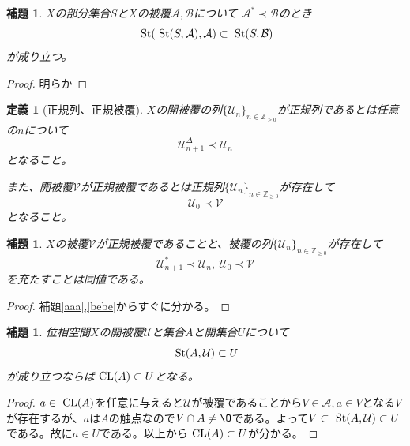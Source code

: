 \documentclass[leqno]{jsarticle}
\newtheorem{lem}[thm]{補題}
\newtheorem{df}[thm]{定義}
\newcommand{\zz}{\mathbb{Z}}
\newcommand{\cl}{\text{  {\rm CL}} }
\newcommand{\uu}{\mathcal{U}}
\newcommand{\A}{\mathcal{A}}
\newcommand{\B}{\mathcal{B}}
\newcommand{\s}{\text{  {\rm St}} }
\newcommand{\dd}{\Delta}
\newcommand{\pr}{\prec}
\newcommand{\zr}{\zz_{\ge0}}
\begin{document}
\begin{lem}
$X$の部分集合$S$と$X$の被覆$\A,\B$について
$\A^{*}\pr \B$のとき
\[
\s(\s(S,\A),\A)\subset  \s(S,\B)
\]
が成り立つ。
\end{lem}
\begin{proof}
明らか
\end{proof}


\begin{df}[正規列、正規被覆]
$X$の開被覆の列$\{\uu_n\}_{n\in \zr}$が正規列であるとは任意の$n$について
\[
\uu_{n+1}^{\dd}\pr \uu_n
\]
となること。\par
また、開被覆$\mathcal{V}$が正規被覆であるとは正規列$\{\uu_n\}_{n\in \zr}$が存在して
\[
\uu_0\pr\mathcal{V}
\]
となること。
\end{df}


\setcounter{equation}{0}
\begin{lem}\label{ccc}
$X$の被覆$\mathcal{V}$が正規被覆であることと、被覆の列$\{\uu_n\}_{n\in \zr}$が存在して
\[
\uu^{*}_{n+1}\pr\uu_n,\ \uu_0\pr\mathcal{V}
\]
を充たすことは同値である。

\end{lem}
\begin{proof}
補題\ref{aaa},\ref{bebe}からすぐに分かる。
\end{proof}


\begin{lem}\label{hey}
位相空間$X$の開被覆$\uu$と集合$A$と開集合$U$について
\[
\s(A,\uu)\subset U
\]
が成り立つならば$\cl(A)\subset U$となる。
\end{lem}
\begin{proof}
$a\in \cl(A)$を任意に与えると$\uu$が被覆であることから$V\in \A,a\in V$となる$V$が存在するが、$a$は$A$の触点なので$V\cap A\neq \O$である。よって$V\subset \s(A,\uu)\subset U$である。故に$a\in U$である。以上から$\cl(A)\subset U$が分かる。
\end{proof}
\end{document}
